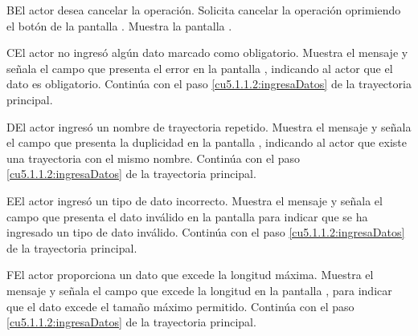  \begin{UCtrayectoriaA}{B}{El actor desea cancelar la operación.}
    \UCpaso[\UCactor] Solicita cancelar la operación oprimiendo el botón  de la pantalla .
    \UCpaso[\UCsist] Muestra la pantalla .
 \end{UCtrayectoriaA}
 
 \begin{UCtrayectoriaA}{C}{El actor no ingresó algún dato marcado como obligatorio.}
    \UCpaso[\UCsist] Muestra el mensaje  y señala el campo que presenta el error en la pantalla 
	    , indicando al actor que el dato es obligatorio.
    \UCpaso[] Continúa con el paso \ref{cu5.1.1.2:ingresaDatos} de la trayectoria principal.
 \end{UCtrayectoriaA}
 \begin{UCtrayectoriaA}{D}{El actor ingresó un nombre de trayectoria repetido.}
    \UCpaso[\UCsist] Muestra el mensaje  y señala el campo que presenta la duplicidad en la pantalla 
	    , indicando al actor que existe una trayectoria con el mismo nombre.
    \UCpaso[] Continúa con el paso \ref{cu5.1.1.2:ingresaDatos} de la trayectoria principal.
 \end{UCtrayectoriaA}
 \begin{UCtrayectoriaA}{E}{El actor ingresó un tipo de dato incorrecto.}
    \UCpaso[\UCsist] Muestra el mensaje  y señala el campo que presenta el dato inválido en la 
    pantalla  para indicar que se ha ingresado un tipo de dato inválido.
    \UCpaso[] Continúa con el paso \ref{cu5.1.1.2:ingresaDatos} de la trayectoria principal.
 \end{UCtrayectoriaA}
 \begin{UCtrayectoriaA}{F}{El actor proporciona un dato que excede la longitud máxima.}
    \UCpaso[\UCsist] Muestra el mensaje  y señala el campo que excede la 
    longitud en la pantalla , para indicar que el dato excede el tamaño máximo permitido.
    \UCpaso[] Continúa con el paso \ref{cu5.1.1.2:ingresaDatos} de la trayectoria principal.
 \end{UCtrayectoriaA}
 
